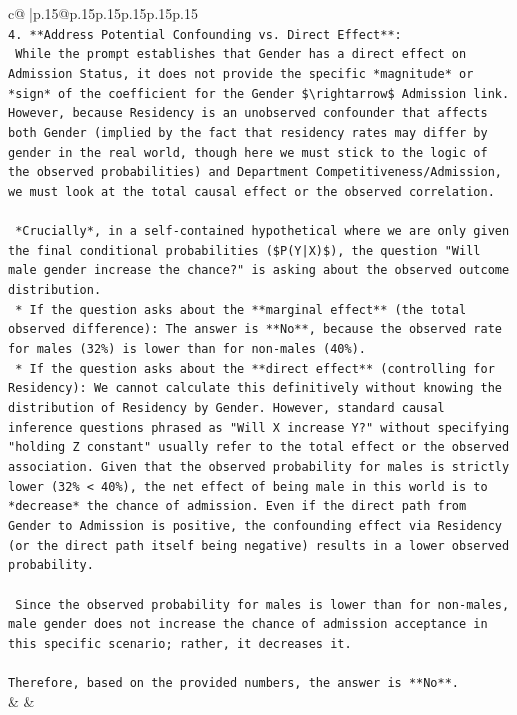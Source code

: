 \documentclass{article}
\begin{document}
{\begin{supertabular}{c@{$\;$}|p{.15\linewidth}@{}p{.15\linewidth}p{.15\linewidth}p{.15\linewidth}p{.15\linewidth}p{.15\linewidth}}
{{{\\ 
\texttt{4.  **Address Potential Confounding vs. Direct Effect**:} \\
\texttt{    While the prompt establishes that Gender has a direct effect on Admission Status, it does not provide the specific *magnitude* or *sign* of the coefficient for the Gender \$\textbackslash{}rightarrow\$ Admission link. However, because Residency is an unobserved confounder that affects both Gender (implied by the fact that residency rates may differ by gender in the real world, though here we must stick to the logic of the observed probabilities) and Department Competitiveness/Admission, we must look at the total causal effect or the observed correlation.} \\
\\ 
\texttt{    *Crucially*, in a self{-}contained hypothetical where we are only given the final conditional probabilities (\$P(Y|X)\$), the question "Will male gender increase the chance?" is asking about the observed outcome distribution.} \\
\texttt{    *   If the question asks about the **marginal effect** (the total observed difference): The answer is **No**, because the observed rate for males (32\%) is lower than for non{-}males (40\%).} \\
\texttt{    *   If the question asks about the **direct effect** (controlling for Residency): We cannot calculate this definitively without knowing the distribution of Residency by Gender. However, standard causal inference questions phrased as "Will X increase Y?" without specifying "holding Z constant" usually refer to the total effect or the observed association. Given that the observed probability for males is strictly lower (32\% < 40\%), the net effect of being male in this world is to *decrease* the chance of admission. Even if the direct path from Gender to Admission is positive, the confounding effect via Residency (or the direct path itself being negative) results in a lower observed probability.} \\
\\ 
\texttt{    Since the observed probability for males is lower than for non{-}males, male gender does not increase the chance of admission acceptance in this specific scenario; rather, it decreases it.} \\
\\ 
\texttt{Therefore, based on the provided numbers, the answer is **No**.} \\
            }
        }
    }
    & & \\ \\


\end{supertabular}}
\end{document}
